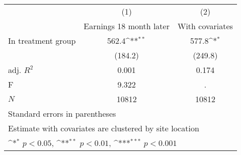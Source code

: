 {
\def\sym#1{\ifmmode^{#1}\else\(^{#1}\)\fi}
\begin{tabular}{l*{2}{c}}
\hline\hline
            &\multicolumn{1}{c}{(1)}&\multicolumn{1}{c}{(2)}\\
            &\multicolumn{1}{c}{Earnings 18 month later}&\multicolumn{1}{c}{With covariates}\\
\hline
In treatment group&       562.4\sym{**} &       577.8\sym{*}  \\
            &     (184.2)         &     (249.8)         \\
\hline
adj. \(R^{2}\)&       0.001         &       0.174         \\
F           &       9.322         &           .         \\
\(N\)       &       10812         &       10812         \\
\hline\hline
\multicolumn{3}{l}{\footnotesize Standard errors in parentheses}\\
\multicolumn{3}{l}{\footnotesize Estimate with covariates are clustered by site location}\\
\multicolumn{3}{l}{\footnotesize \sym{*} \(p<0.05\), \sym{**} \(p<0.01\), \sym{***} \(p<0.001\)}\\
\end{tabular}
}
